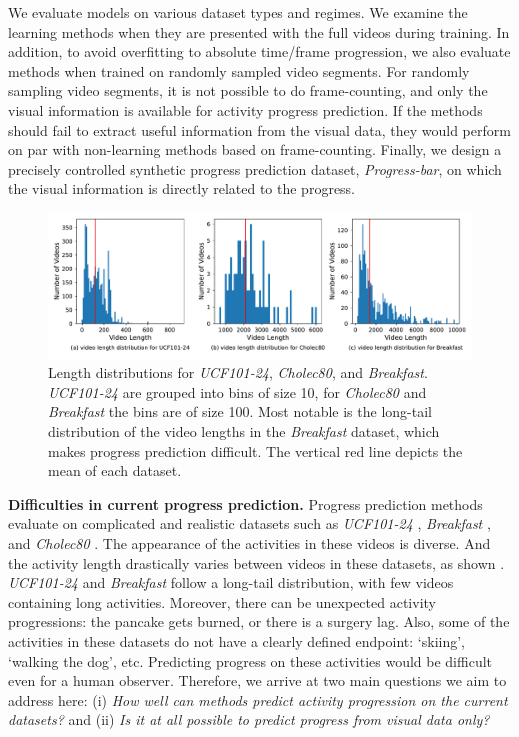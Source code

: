 We evaluate models on various dataset types and regimes. We examine the learning methods when they are presented with the full videos during training. In addition, to avoid overfitting to absolute time\slash frame progression, we also evaluate methods when trained on randomly sampled video segments. 
For randomly sampling video segments, it is not possible to do frame-counting, and only the visual information is available for activity progress prediction.
If the methods should fail to extract useful information from the visual data, they would perform on par with non-learning methods based on frame-counting.
Finally, we design a precisely controlled synthetic progress prediction dataset, \textsl{Progress-bar}, on which the visual information is directly related to the progress.
\begin{figure}[t!]  
    \centering
    \includegraphics[width=.9\linewidth]{media/dataset_lengths.pdf}
    \caption{
        Length distributions for \textsl{UCF101-24}, \textsl{Cholec80}, and \textsl{Breakfast}. \textsl{UCF101-24} are grouped into bins of size 10, for \textsl{Cholec80} and \textsl{Breakfast} the bins are of size 100. 
        Most notable is the long-tail distribution of the video lengths in the \textsl{Breakfast} dataset, which makes progress prediction difficult. 
        The vertical red line depicts the mean of each dataset.
   }
    \label{fig:lengths}
\end{figure}

\medskip\noindent\textbf{Difficulties in current progress prediction.}
Progress prediction methods \cite{becattini2017, kukleva2019, twinanda2019} evaluate on complicated and realistic datasets such as \textsl{UCF101-24} \cite{soomro2012}, \textsl{Breakfast} \cite{kuehne2014, kuehne2016}, and \textsl{Cholec80} \cite{twinanda2016}. 
The appearance of the activities in these videos is diverse. 
And the activity length drastically varies between videos in these datasets, as shown .
\textsl{UCF101-24} and \textsl{Breakfast} follow a long-tail distribution, with few videos containing long activities.
Moreover, there can be unexpected activity progressions: \eg the pancake gets burned, or there is a surgery lag. 
Also, some of the activities in these datasets do not have a clearly defined endpoint: \eg `skiing', `walking the dog', etc. 
Predicting progress on these activities would be difficult even for a human observer. 
Therefore, we arrive at two main questions we aim to address here: 
(i) \textsl{How well can methods predict activity progression on the current datasets?} and 
(ii) \textsl{Is it at all possible to predict progress from visual data only?}


